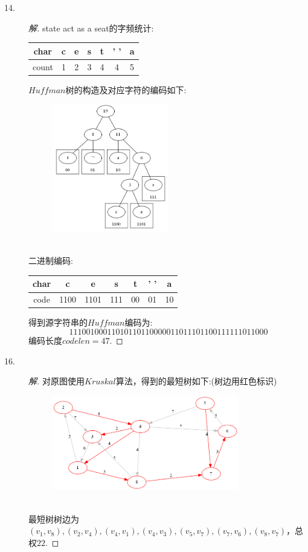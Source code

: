 \documentclass[UTF8, onecolumn, a4paper]{article}
\begin{document}
\begin{description}
\item[14.]
\begin{proof}[解]
state act as a seat的字频统计:
\begin{center}
	\begin{tabular}{ccccccc}
		\hline
		char &c & e & s & t & ' ' & a\\
		\hline
		count&1& 2& 3& 4 & 4 & 5\\
		\hline
	\end{tabular}
\end{center}
$Huffman$树的构造及对应字符的编码如下:
\begin{figure}[h]
	\centering
	\includegraphics[width=0.5\textwidth]{demo11.png}
\end{figure}
\\二进制编码:
\begin{center}
	\begin{tabular}{ccccccc}
		\hline
		char &c & e & s & t & ' ' & a\\
		\hline
		code&1100& 1101& 111& 00 & 01 & 10\\
		\hline
	\end{tabular}
\end{center}
得到源字符串的$Huffman$编码为:
$$11100100011010110110000011011101100111111011000$$
编码长度$codelen=47$.
\end{proof}

\item[16.]
\begin{proof}[解]
对原图使用$Kruskal$算法，得到的最短树如下:(树边用红色标识)	
\begin{figure}[h]
	\centering
	\includegraphics[width=0.8\textwidth]{demo12.png}
\end{figure}	
\\最短树树边为$(v_1,v_8),(v_2,v_4),(v_4,v_1),(v_4,v_3),(v_5,v_7),(v_7,v_6),(v_8,v_7)$，总权$22$.
\end{proof}


\end{description}
\end{document}
